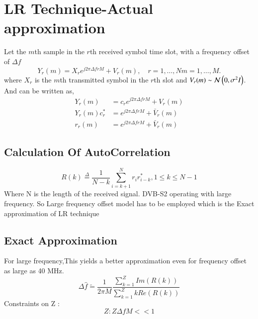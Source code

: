 \documentclass[journal,12pt,twocolumn]{IEEEtran}
\begin{document}
\section{LR Technique-Actual approximation }
Let the $m$th sample in the $r$th received symbol time slot, with a frequency offset of $\Delta f$ \cite{1}
\begin{equation}
Y_r(m)= X_r e^{j2\pi\Delta frM} + V_r(m), \quad r = 1,\dots,N m = 1 ,\dots,M.
\end{equation}  
where $X_r$ is the $m$th transmitted symbol in the $r$th slot and $V_r(m) \sim \mathcal{N}\left(0,\sigma^2 I\right) $. 
And can be written as,
\begin{align}
Y_r(m)&=c_r e^{j2\pi\Delta frM}+ V_r(m)\\
Y_r(m)c^*_r&= e^{j2\pi\Delta frM}+ \bar{V}_r(m)\\
r_r(m)&=e^{j2\pi\Delta frM}+ \bar{V}_r(m)
\end{align}
\subsection{Calculation Of AutoCorrelation}
\begin{equation}
R(k) \overset{\Delta}{=} \frac{1}{N-k}\sum_{i=k+1}^{N} r_{i}r^{*}_{i-k}
 , 1 \leq k \leq N-1
\end{equation}
Where N is the length of the received signal.
DVB-S2 operating with large frequency. So Large frequency offset model has to be employed which is the  Exact approximation of LR technique \cite{1}
\subsection{Exact Approximation}
For large frequency,This yields a better approximation even for frequency offset as large as 40 MHz.
\begin{equation}
\Delta\hat{f}\widetilde{=} \frac{1}{2\pi M}\frac{\sum_{k=1}^{Z}Im(R(k))}{\sum_{k=1}^{Z}kRe(R(k))} 
\end{equation}
Constraints on Z :\begin{equation}\label{eq:Z}
Z: Z\Delta{f}M << 1
\end{equation}
\end{document}
